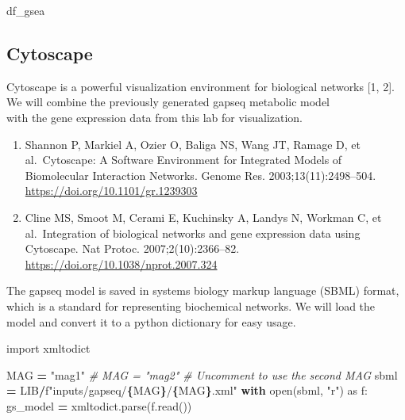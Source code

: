 \documentclass[
]{book}
\newenvironment{Shaded}{\begin{snugshade}}{\end{snugshade}}
\newcommand{\BuiltInTok}[1]{#1}
\newcommand{\CommentTok}[1]{\textcolor[rgb]{0.56,0.35,0.01}{\textit{#1}}}
\newcommand{\ControlFlowTok}[1]{\textcolor[rgb]{0.13,0.29,0.53}{\textbf{#1}}}
\newcommand{\ImportTok}[1]{#1}
\newcommand{\NormalTok}[1]{#1}
\newcommand{\OperatorTok}[1]{\textcolor[rgb]{0.81,0.36,0.00}{\textbf{#1}}}
\newcommand{\SpecialCharTok}[1]{\textcolor[rgb]{0.81,0.36,0.00}{\textbf{#1}}}
\newcommand{\SpecialStringTok}[1]{\textcolor[rgb]{0.31,0.60,0.02}{#1}}
\newcommand{\StringTok}[1]{\textcolor[rgb]{0.31,0.60,0.02}{#1}}
\providecommand{\tightlist}{%
  \setlength{\itemsep}{0pt}\setlength{\parskip}{0pt}}
\begin{document}
\begin{Shaded}
\begin{Highlighting}[numbers=left,,]
\NormalTok{df\_gsea}
\end{Highlighting}
\end{Shaded}

\subsection{Cytoscape}\label{cytoscape}

Cytoscape is a powerful visualization environment for biological networks {[}1, 2{]}. We will combine the previously generated gapseq metabolic model\\
with the gene expression data from this lab for visualization.

\begin{enumerate}
\def\labelenumi{\arabic{enumi}.}
\tightlist
\item
  Shannon P, Markiel A, Ozier O, Baliga NS, Wang JT, Ramage D, et al.~Cytoscape: A Software Environment for Integrated Models of Biomolecular Interaction Networks. Genome Res. 2003;13(11):2498--504. \url{https://doi.org/10.1101/gr.1239303}
\item
  Cline MS, Smoot M, Cerami E, Kuchinsky A, Landys N, Workman C, et al.~Integration of biological networks and gene expression data using Cytoscape. Nat Protoc. 2007;2(10):2366--82. \url{https://doi.org/10.1038/nprot.2007.324}
\end{enumerate}

The gapseq model is saved in systems biology markup language (SBML) format, which is a standard for representing biochemical networks.
We will load the model and convert it to a python dictionary for easy usage.

\begin{Shaded}
\begin{Highlighting}[numbers=left,,]
\ImportTok{import}\NormalTok{ xmltodict}

\NormalTok{MAG }\OperatorTok{=} \StringTok{"mag1"}
\CommentTok{\# MAG = "mag2"  \# Uncomment to use the second MAG}
\NormalTok{sbml }\OperatorTok{=}\NormalTok{ LIB}\OperatorTok{/}\SpecialStringTok{f"inputs/gapseq/}\SpecialCharTok{\{}\NormalTok{MAG}\SpecialCharTok{\}}\SpecialStringTok{/}\SpecialCharTok{\{}\NormalTok{MAG}\SpecialCharTok{\}}\SpecialStringTok{.xml"}
\ControlFlowTok{with} \BuiltInTok{open}\NormalTok{(sbml, }\StringTok{"r"}\NormalTok{) }\ImportTok{as}\NormalTok{ f:}
\NormalTok{    gs\_model }\OperatorTok{=}\NormalTok{ xmltodict.parse(f.read())}
\end{Highlighting}
\end{Shaded}
\end{document}
